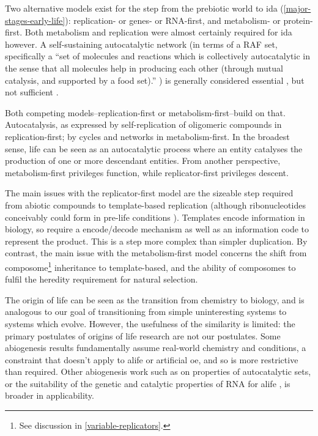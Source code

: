\begin{mdframed}[style=box, frametitle={The orgins of life}]
Two alternative models exist for the step from the prebiotic world  to \gls{ida} (\cref{major-stages-early-life}): replication- or genes- or RNA-first, and metabolism- or protein-first. Both metabolism and replication were almost certainly required for \gls{ida} however. A self-sustaining autocatalytic network (in terms of a RAF set, specifically a ``set of molecules and reactions which is collectively autocatalytic in the sense that all molecules help in producing each other (through mutual catalysis, and supported by a food set).'' \parencite{Hordijk2011}) is generally considered essential \parencite{Pross2013}, but not sufficient \parencite{Hordijk2011}. 

Both competing models--replication-first or metabolism-first--build on that. Autocatalysis, as expressed by self-replication of oligomeric compounds in replication-first; by cycles and networks in metabolism-first. In the broadest sense, life can be seen as an autocatalytic process where an entity catalyses the production of one or more descendant entities. From another perspective, metabolism-first privileges function, while replicator-first privileges descent.

The main issues with the replicator-first model are the sizeable step required from abiotic compounds to template-based replication (although ribonucleotides conceivably could form in pre-life conditions \parencite{Powner2009}). Templates encode information in biology, so require a encode/decode mechanism as well as an information code to represent the product. This is a step more complex than simpler duplication. By contrast, the main issue with the metabolism-first model concerns the shift from composome\footnote{See discussion in \cref{variable-replicators}.} inheritance to template-based, and the ability of composomes to fulfil the heredity requirement for natural selection.

The origin of life can be seen as the transition from chemistry to biology, and is analogous to our goal of transitioning from simple uninteresting systems to systems which evolve. However, the usefulness of the similarity is limited: the primary postulates of origins of life research are not our postulates. Some abiogenesis results fundamentally assume real-world chemistry and conditions, a constraint that doesn't apply to \gls{alife} or artificial \gls{oe}, and so is more restrictive than required. Other abiogenesis work such as on properties of autocatalytic sets, or the suitability of the genetic and catalytic properties of RNA for \gls{alife} \parencite{Cheng2010}, is broader in applicability.
\end{mdframed}


